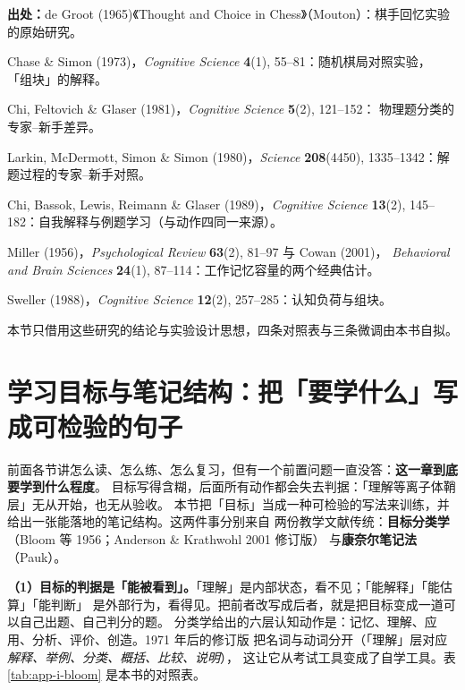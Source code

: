 {\footnotesize
\textbf{出处：}de Groot (1965)《Thought and Choice in Chess》（Mouton）：棋手回忆实验的原始研究。

Chase \& Simon (1973)，\textit{Cognitive Science} \textbf{4}(1), 55--81：随机棋局对照实验，
「组块」的解释。

Chi, Feltovich \& Glaser (1981)，\textit{Cognitive Science} \textbf{5}(2), 121--152：
物理题分类的专家--新手差异。

Larkin, McDermott, Simon \& Simon (1980)，\textit{Science}
\textbf{208}(4450), 1335--1342：解题过程的专家--新手对照。

Chi, Bassok, Lewis, Reimann \& Glaser
(1989)，\textit{Cognitive Science} \textbf{13}(2), 145--182：自我解释与例题学习（与动作四同一来源）。

Miller (1956)，\textit{Psychological Review} \textbf{63}(2), 81--97 与 Cowan (2001)，
\textit{Behavioral and Brain Sciences} \textbf{24}(1), 87--114：工作记忆容量的两个经典估计。

Sweller (1988)，\textit{Cognitive Science} \textbf{12}(2), 257--285：认知负荷与组块。

本节只借用这些研究的结论与实验设计思想，四条对照表与三条微调由本书自拟。
}

\section{学习目标与笔记结构：把「要学什么」写成可检验的句子}
\label{sec:app-i-objectives}

前面各节讲怎么读、怎么练、怎么复习，但有一个前置问题一直没答：\textbf{这一章到底要学到什么程度}。
目标写得含糊，后面所有动作都会失去判据：「理解等离子体鞘层」无从开始，也无从验收。
本节把「目标」当成一种可检验的写法来训练，并给出一张能落地的笔记结构。这两件事分别来自
两份教学文献传统：\textbf{目标分类学}（Bloom 等 1956；Anderson \& Krathwohl 2001 修订版）
与\textbf{康奈尔笔记法}（Pauk）。

\textbf{（1）目标的判据是「能被看到」。}「理解」是内部状态，看不见；「能解释」「能估算」「能判断」
是外部行为，看得见。把前者改写成后者，就是把目标变成一道可以自己出题、自己判分的题。
分类学给出的六层认知动作是：记忆、理解、应用、分析、评价、创造。1971 年后的修订版
把名词与动词分开（「理解」层对应\emph{解释、举例、分类、概括、比较、说明}），
这让它从考试工具变成了自学工具。表 \ref{tab:app-i-bloom} 是本书的对照表。

